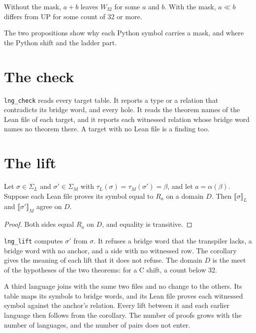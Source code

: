\begin{proposition}
Without the mask, $a + b$ leaves $W_{32}$ for some $a$ and $b$. With the mask, $a \ll b$ differs from UP for some
count of 32 or more.
\end{proposition}

The two propositions show why each Python symbol carries a mask, and where the Python shift and the ladder part.

\section{The check}

\texttt{lng\_check} reads every target table. It reports a type or a relation that contradicts its bridge word,
and every hole. It reads the theorem names of the Lean file of each target, and it reports each witnessed relation
whose bridge word names no theorem there. A target with no Lean file is a finding too.

\section{The lift}

\begin{corollary}
Let $\sigma \in \Sigma_L$ and $\sigma' \in \Sigma_M$ with $\tau_L(\sigma) = \tau_M(\sigma') = \beta$, and let
$a = \alpha(\beta)$. Suppose each Lean file proves its symbol equal to $R_a$ on a domain $D$. Then
$\lBrack\sigma\rBrack_L$ and $\lBrack\sigma'\rBrack_M$ agree on $D$.
\end{corollary}

\begin{proof}
Both sides equal $R_a$ on $D$, and equality is transitive.
\end{proof}

\texttt{lng\_lift} computes $\sigma'$ from $\sigma$. It refuses a bridge word that the transpiler lacks, a bridge
word with no anchor, and a side with no witnessed row. The corollary gives the meaning of each lift that it does
not refuse. The domain $D$ is the meet of the hypotheses of the two theorems: for a C shift, a count below 32.

A third language joins with the same two files and no change to the others. Its table maps its symbols to bridge
words, and its Lean file proves each witnessed symbol against the anchor's relation. Every lift between it and each
earlier language then follows from the corollary. The number of proofs grows with the number of languages, and the
number of pairs does not enter.
